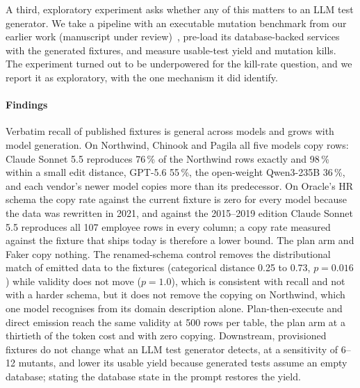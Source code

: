 \documentclass[preprint,12pt]{elsarticle}
\begin{document}
A third, exploratory experiment asks whether any of this matters to an LLM test generator. We take a pipeline with an executable mutation benchmark from our earlier work (manuscript under review)~\cite{javvadi2026raitg}, pre-load its database-backed services with the generated fixtures, and measure usable-test yield and mutation kills. The experiment turned out to be underpowered for the kill-rate question, and we report it as exploratory, with the one mechanism it did identify.

\paragraph{Findings} Verbatim recall of published fixtures is general across models and grows with model generation. On Northwind, Chinook and Pagila all five models copy rows: Claude Sonnet 5.5 reproduces 76\,\% of the Northwind rows exactly and 98\,\% within a small edit distance, GPT-5.6 55\,\%, the open-weight Qwen3-235B 36\,\%, and each vendor's newer model copies more than its predecessor. On Oracle's HR schema the copy rate against the current fixture is zero for every model because the data was rewritten in 2021, and against the 2015--2019 edition Claude Sonnet 5.5 reproduces all 107 employee rows in every column; a copy rate measured against the fixture that ships today is therefore a lower bound. The plan arm and Faker copy nothing. The renamed-schema control removes the distributional match of emitted data to the fixtures (categorical distance 0.25 to 0.73, $p=0.016$) while validity does not move ($p=1.0$), which is consistent with recall and not with a harder schema, but it does not remove the copying on Northwind, which one model recognises from its domain description alone. Plan-then-execute and direct emission reach the same validity at 500 rows per table, the plan arm at a thirtieth of the token cost and with zero copying. Downstream, provisioned fixtures do not change what an LLM test generator detects, at a sensitivity of 6--12 mutants, and lower its usable yield because generated tests assume an empty database; stating the database state in the prompt restores the yield.
\end{document}
